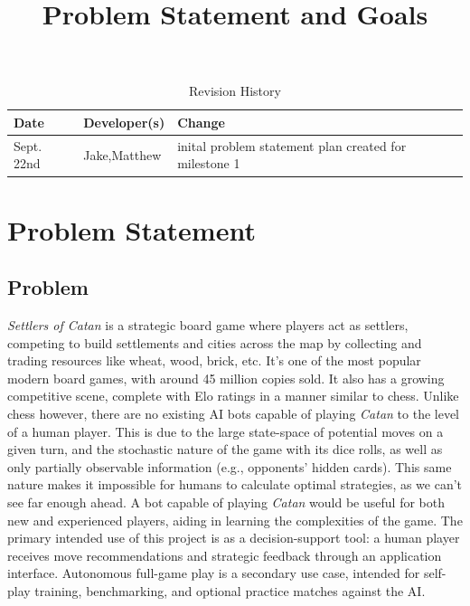 \documentclass{article}
\title{Problem Statement and Goals\\\progname}
\author{\authname}
\date{}
\begin{document}
\maketitle

\begin{table}[hp]
\caption{Revision History} \label{TblRevisionHistory}
\begin{tabularx}{\textwidth}{llX}
\toprule
\textbf{Date} & \textbf{Developer(s)} & \textbf{Change}\\
\midrule
Sept. 22nd & Jake,Matthew & inital problem statement plan created for milestone 1\\
\bottomrule
\end{tabularx}
\end{table}

\section{Problem Statement}\label{sec:problem-statement}

\subsection{Problem}
\emph{Settlers of Catan} is a strategic board game where players act as settlers, competing to build settlements and cities across the map by collecting and trading resources like wheat, wood, brick, etc.
It's one of the most popular modern board games, with around 45 million copies sold.
It also has a growing competitive scene, complete with Elo ratings in a manner similar to chess.
Unlike chess however, there are no existing AI bots capable of playing \emph{Catan} to the level of a human player.
This is due to the large state-space of potential moves on a given turn, and the stochastic nature of the game with its dice rolls, as well as only partially observable information (e.g., opponents' hidden cards).
This same nature makes it impossible for humans to calculate optimal strategies, as we can't see far enough ahead.
A bot capable of playing \emph{Catan} would be useful for both new and experienced players, aiding in learning the 
complexities of the game.
The primary intended use of this project is as a decision-support tool: a human player 
receives move recommendations and strategic feedback through an application interface.
Autonomous full-game play is a secondary use case, intended for self-play training, benchmarking, and optional practice matches against the AI.

\end{document}
